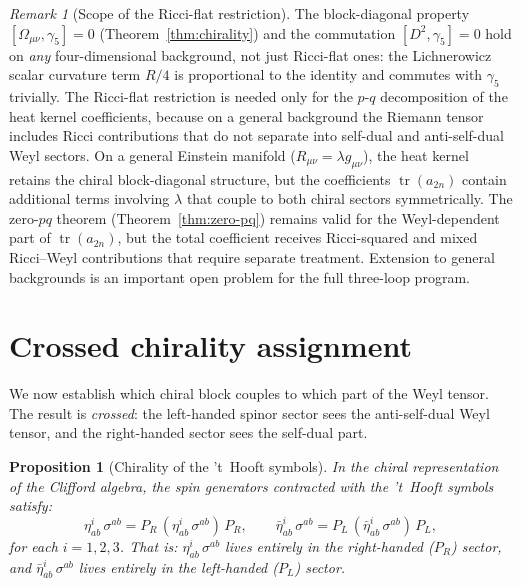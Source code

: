 \documentclass[12pt,a4paper]{article}
\newtheorem{proposition}[theorem]{Proposition}
\theoremstyle{definition}
\theoremstyle{remark}
\newtheorem{remark}[theorem]{Remark}
\newcommand{\tr}{\operatorname{tr}}
\begin{document}
\begin{remark}[Scope of the Ricci-flat restriction]
\label{rem:ricci-flat}
The block-diagonal property $[\Omega_{\mu\nu}, \gamma_5] = 0$
(Theorem~\ref{thm:chirality}) and the commutation
$[D^2, \gamma_5] = 0$ hold on \emph{any} four-dimensional background,
not just Ricci-flat ones: the Lichnerowicz scalar curvature term $R/4$
is proportional to the identity and commutes with $\gamma_5$ trivially.
The Ricci-flat restriction is needed only for the $p$-$q$ decomposition of
the heat kernel coefficients, because on a general background the Riemann
tensor includes Ricci contributions that do not separate into self-dual
and anti-self-dual Weyl sectors.  On a general Einstein manifold
($R_{\mu\nu} = \lambda g_{\mu\nu}$), the heat kernel retains the chiral
block-diagonal structure, but the coefficients $\tr(a_{2n})$ contain
additional terms involving $\lambda$ that couple to both chiral sectors
symmetrically.  The zero-$pq$ theorem (Theorem~\ref{thm:zero-pq}) remains
valid for the Weyl-dependent part of $\tr(a_{2n})$, but the total
coefficient receives Ricci-squared and mixed Ricci--Weyl contributions that
require separate treatment.  Extension to general backgrounds is an
important open problem for the full three-loop program.
\end{remark}


\section{Crossed chirality assignment}
\label{sec:crossed}

We now establish which chiral block couples to which part of the Weyl tensor.
The result is \emph{crossed}: the left-handed spinor sector sees the
anti-self-dual Weyl tensor, and the right-handed sector sees the self-dual
part.

\begin{proposition}[Chirality of the 't~Hooft symbols]
\label{prop:thooft}
In the chiral representation of the Clifford algebra, the spin generators
contracted with the 't~Hooft symbols satisfy:
\begin{equation}\label{eq:eta-chirality}
  \eta^i_{ab}\,\sigma^{ab} = P_R\,(\eta^i_{ab}\,\sigma^{ab})\,P_R,
  \qquad
  \bar\eta^i_{ab}\,\sigma^{ab} = P_L\,(\bar\eta^i_{ab}\,\sigma^{ab})\,P_L,
\end{equation}
for each $i = 1,2,3$.  That is:
$\eta^i_{ab}\,\sigma^{ab}$ lives entirely in the right-handed ($P_R$) sector,
and $\bar\eta^i_{ab}\,\sigma^{ab}$ lives entirely in the left-handed ($P_L$)
sector.
\end{proposition}
\end{document}
